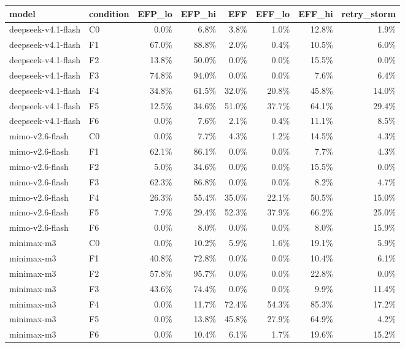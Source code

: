 \begin{tabular}{llrrrrrr}
\toprule
model & condition & EFP\_lo & EFP\_hi & EFF & EFF\_lo & EFF\_hi & retry\_storm \\
\midrule
deepseek-v4.1-flash & C0 & 0.0\% & 6.8\% & 3.8\% & 1.0\% & 12.8\% & 1.9\% \\
deepseek-v4.1-flash & F1 & 67.0\% & 88.8\% & 2.0\% & 0.4\% & 10.5\% & 6.0\% \\
deepseek-v4.1-flash & F2 & 13.8\% & 50.0\% & 0.0\% & 0.0\% & 15.5\% & 0.0\% \\
deepseek-v4.1-flash & F3 & 74.8\% & 94.0\% & 0.0\% & 0.0\% & 7.6\% & 6.4\% \\
deepseek-v4.1-flash & F4 & 34.8\% & 61.5\% & 32.0\% & 20.8\% & 45.8\% & 14.0\% \\
deepseek-v4.1-flash & F5 & 12.5\% & 34.6\% & 51.0\% & 37.7\% & 64.1\% & 29.4\% \\
deepseek-v4.1-flash & F6 & 0.0\% & 7.6\% & 2.1\% & 0.4\% & 11.1\% & 8.5\% \\
mimo-v2.6-flash & C0 & 0.0\% & 7.7\% & 4.3\% & 1.2\% & 14.5\% & 4.3\% \\
mimo-v2.6-flash & F1 & 62.1\% & 86.1\% & 0.0\% & 0.0\% & 7.7\% & 4.3\% \\
mimo-v2.6-flash & F2 & 5.0\% & 34.6\% & 0.0\% & 0.0\% & 15.5\% & 0.0\% \\
mimo-v2.6-flash & F3 & 62.3\% & 86.8\% & 0.0\% & 0.0\% & 8.2\% & 4.7\% \\
mimo-v2.6-flash & F4 & 26.3\% & 55.4\% & 35.0\% & 22.1\% & 50.5\% & 15.0\% \\
mimo-v2.6-flash & F5 & 7.9\% & 29.4\% & 52.3\% & 37.9\% & 66.2\% & 25.0\% \\
mimo-v2.6-flash & F6 & 0.0\% & 8.0\% & 0.0\% & 0.0\% & 8.0\% & 15.9\% \\
minimax-m3 & C0 & 0.0\% & 10.2\% & 5.9\% & 1.6\% & 19.1\% & 5.9\% \\
minimax-m3 & F1 & 40.8\% & 72.8\% & 0.0\% & 0.0\% & 10.4\% & 6.1\% \\
minimax-m3 & F2 & 57.8\% & 95.7\% & 0.0\% & 0.0\% & 22.8\% & 0.0\% \\
minimax-m3 & F3 & 43.6\% & 74.4\% & 0.0\% & 0.0\% & 9.9\% & 11.4\% \\
minimax-m3 & F4 & 0.0\% & 11.7\% & 72.4\% & 54.3\% & 85.3\% & 17.2\% \\
minimax-m3 & F5 & 0.0\% & 13.8\% & 45.8\% & 27.9\% & 64.9\% & 4.2\% \\
minimax-m3 & F6 & 0.0\% & 10.4\% & 6.1\% & 1.7\% & 19.6\% & 15.2\% \\

\end{tabular}
